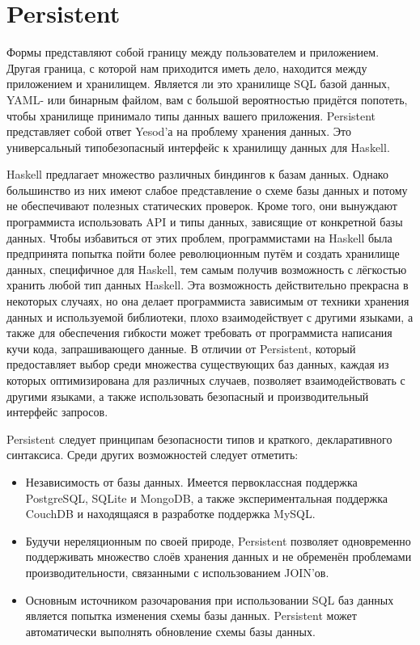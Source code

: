 \chapter{Persistent}\label{chap:persistent}

Формы представляют собой границу между пользователем и приложением. Другая
граница, с которой нам приходится иметь дело, находится между приложением и
хранилищем. Является ли это хранилище SQL базой данных, YAML- или бинарным
файлом, вам с большой вероятностью придётся попотеть, чтобы хранилище принимало
типы данных вашего приложения. Persistent представляет собой ответ Yesod'а на
проблему хранения данных. Это универсальный типобезопасный интерфейс к
хранилищу данных для Haskell.

Haskell предлагает множество различных биндингов к базам данных. Однако
большинство из них имеют слабое представление о схеме базы данных и потому не
обеспечивают полезных статических проверок. Кроме того, они вынуждают
программиста использовать API и типы данных, зависящие от конкретной базы
данных. Чтобы избавиться от этих проблем, программистами на Haskell была
предпринята попытка пойти более революционным путём и создать хранилище данных,
специфичное для Haskell, тем самым получив возможность с лёгкостью хранить
любой тип данных Haskell. Эта возможность действительно прекрасна в некоторых
случаях, но она делает программиста зависимым от техники хранения данных и
используемой библиотеки, плохо взаимодействует с другими языками, а также для
обеспечения гибкости может требовать от программиста написания кучи кода,
запрашивающего данные. В отличии от Persistent, который предоставляет выбор
среди множества существующих баз данных, каждая из которых оптимизирована для
различных случаев, позволяет взаимодействовать с другими языками, а также
использовать безопасный и производительный интерфейс запросов.

Persistent следует принципам безопасности типов и краткого, декларативного
синтаксиса. Среди других возможностей следует отметить:
\begin{itemize}
  \item Независимость от базы данных. Имеется первоклассная поддержка
      PostgreSQL, SQLite и MongoDB, а также экспериментальная поддержка CouchDB
      и находящаяся в разработке поддержка MySQL.

  \item Будучи нереляционным по своей природе, Persistent позволяет
      одновременно поддерживать множество слоёв хранения данных и не обременён
      проблемами производительности, связанными с использованием JOIN'ов.

  \item Основным источником разочарования при использовании SQL баз данных
      является попытка изменения схемы базы данных. Persistent может
      автоматически выполнять обновление схемы базы данных.
\end{itemize}

